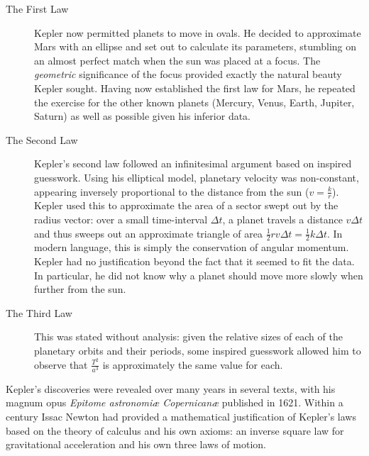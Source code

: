 \begin{description}
  \item[The First Law] Kepler now permitted planets to move in ovals. He decided to approximate Mars with an ellipse and set out to calculate its parameters, stumbling on an almost perfect match when the sun was placed at a focus. The \emph{geometric} significance of the focus provided exactly the natural beauty Kepler sought. Having now established the first law for Mars, he repeated the exercise for the other known planets (Mercury, Venus, Earth, Jupiter, Saturn) as well as possible given his inferior data.
  
  \item[The Second Law]\label{pg:kepler2} Kepler's second law followed an infinitesimal argument based on inspired guesswork. Using his elliptical model, planetary velocity was non-constant, appearing inversely proportional to the distance from the sun ($v=\frac kr$). Kepler used this to approximate the area of a sector swept out by the radius vector: over a small time-interval $\Delta t$, a planet travels a distance $v\Delta t$ and thus sweeps out an approximate triangle of area $\frac 12rv\Delta t=\frac 12k\Delta t$. In modern language, this is simply the conservation of angular momentum. Kepler had no justification beyond the fact that it seemed to fit the data. In particular, he did not know why a planet should move more slowly when further from the sun.
  
  \item[The Third Law] This was stated without analysis: given the relative sizes of each of the planetary orbits and their periods, some inspired guesswork allowed him to observe that $\frac{T^2}{a^3}$ is approximately the same value for each.
\end{description}


Kepler's discoveries were revealed over many years in several texts, with his magnum opus \emph{Epitome astronomiæ Copernicanæ} published in 1621. Within a century Issac Newton had provided a mathematical justification of Kepler's laws based on the theory of calculus and his own axioms: an inverse square law for gravitational acceleration and his own three laws of motion.
\goodbreak


